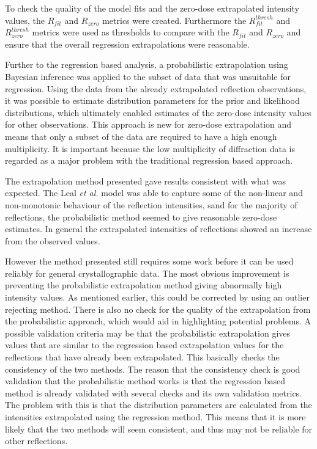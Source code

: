 To check the quality of the model fits and the zero-dose extrapolated intensity values, the $R_{fit}$ and $R_{zero}$ metrics were created.
Furthermore the $R^{thresh}_{fit}$ and $R^{thresh}_{zero}$ metrics were used as thresholds to compare with the $R_{fit}$ and $R_{zero}$ and ensure that the overall regression extrapolations were reasonable.

Further to the regression based analysis, a probabilistic extrapolation using Bayesian inference was applied to the subset of data that was unsuitable for regression.
Using the data from the already extrapolated reflection observations, it was possible to estimate distribution parameters for the prior and likelihood distributions, which ultimately enabled estimates of the zero-dose intensity values for other observations.
This approach is new for zero-dose extrapolation and means that only a subset of the data are required to have a high enough multiplicity.
It is important because the low multiplicity of diffraction data is regarded as a major problem with the traditional regression based approach.

The extrapolation method presented gave results consistent with what was expected.
The Leal \textit{et al.} model was able to capture some of the non-linear and non-monotonic behaviour of the reflection intensities, sand for the majority of reflections, the probabilistic method seemed to give reasonable zero-dose estimates.
In general the extrapolated intensities of reflections showed an increase from the observed values.

However the method presented still requires some work before it can be used reliably for general crystallographic data.
The most obvious improvement is preventing the probabilistic extrapolation method giving abnormally high intensity values.
As mentioned earlier, this could be corrected by using an outlier rejecting method.
There is also no check for the quality of the extrapolation from the probabilistic approach, which would aid in highlighting potential problems.
A possible validation criteria may be that the probabilistic extrapolation gives values that are similar to the regression based extrapolation values for the reflections that have already been extrapolated.
This basically checks the consistency of the two methods.
The reason that the consistency check is good validation that the probabilistic method works is that the regression based method is already validated with several checks and its own validation metrics.
The problem with this is that the distribution parameters are calculated from the intensities extrapolated using the regression method.
This means that it is more likely that the two methods will seem consistent, and thus may not be reliable for other reflections.

